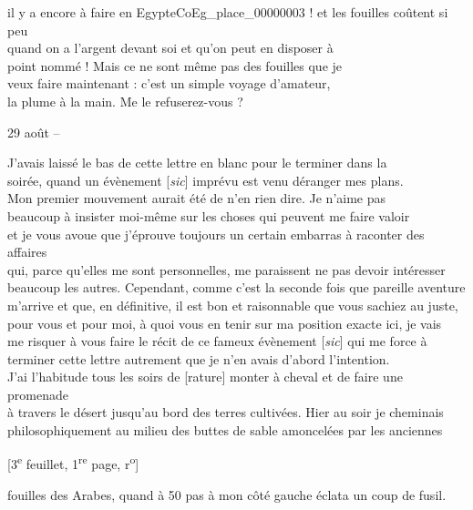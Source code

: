 \documentclass{book}
\begin{document}
il y a encore à faire en Egypte\gls{CoEg_place_00000003} ! et les fouilles coûtent si peu\\
quand on a l’argent devant soi et qu’on peut en disposer à\\
point nommé ! Mais ce ne sont même pas des fouilles que je\\
veux faire maintenant : c’est un simple voyage d’amateur,\\
la plume à la main. Me le refuserez-vous ?
{\footnotesize\begin{flushright}29 août –\end{flushright}}
\indent J’avais laissé le bas de cette lettre en blanc pour le terminer dans la\\
soirée, quand un évènement {[\textit{sic}]} imprévu est venu déranger mes plans.\\
\indent Mon premier mouvement aurait été de n’en rien dire. Je n’aime pas\\
beaucoup à insister moi-même sur les choses qui peuvent me faire valoir\\
et je vous avoue que j’éprouve toujours un certain embarras à raconter des affaires\\
qui, parce qu’elles me sont personnelles, me paraissent ne pas devoir intéresser\\
beaucoup les autres. Cependant, comme c’est la seconde fois que pareille aventure\\
m’arrive et que, en définitive, il est bon et raisonnable que vous sachiez au juste,\\
pour vous et pour moi, à quoi vous en tenir sur ma position exacte ici, je vais\\
me risquer à vous faire le récit de ce fameux évènement {[\textit{sic}]} qui me force à\\
terminer cette lettre autrement que je n’en avais d’abord l’intention.\\
\indent J’ai l’habitude tous les soirs de [rature] monter à cheval et de faire une promenade\\
à travers le désert jusqu’au bord des terres cultivées. Hier au soir je cheminais\\
philosophiquement au milieu des buttes de sable amoncelées par les anciennes
{\footnotesize\begin{center} {[3\textsuperscript{e} feuillet, 1\textsuperscript{re} page, r\textsuperscript{o}]}\end{center}}
\noindent fouilles des Arabes, quand à 50 pas à mon côté gauche éclata un coup de fusil.\\
\end{document}
